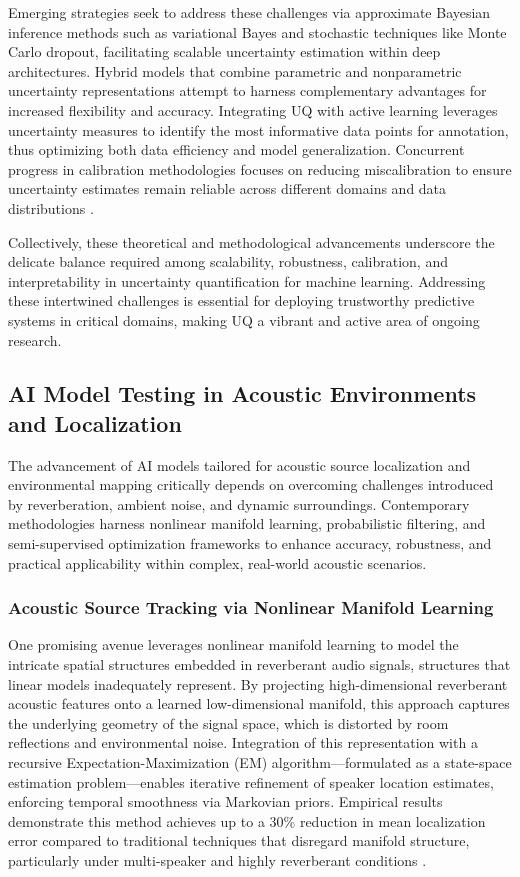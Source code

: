 \documentclass[sigconf]{acmart}
\begin{document}
Emerging strategies seek to address these challenges via approximate Bayesian inference methods such as variational Bayes and stochastic techniques like Monte Carlo dropout, facilitating scalable uncertainty estimation within deep architectures. Hybrid models that combine parametric and nonparametric uncertainty representations attempt to harness complementary advantages for increased flexibility and accuracy. Integrating UQ with active learning leverages uncertainty measures to identify the most informative data points for annotation, thus optimizing both data efficiency and model generalization. Concurrent progress in calibration methodologies focuses on reducing miscalibration to ensure uncertainty estimates remain reliable across different domains and data distributions \cite{ref28}.

Collectively, these theoretical and methodological advancements underscore the delicate balance required among scalability, robustness, calibration, and interpretability in uncertainty quantification for machine learning. Addressing these intertwined challenges is essential for deploying trustworthy predictive systems in critical domains, making UQ a vibrant and active area of ongoing research.

\subsection{AI Model Testing in Acoustic Environments and Localization}

The advancement of AI models tailored for acoustic source localization and environmental mapping critically depends on overcoming challenges introduced by reverberation, ambient noise, and dynamic surroundings. Contemporary methodologies harness nonlinear manifold learning, probabilistic filtering, and semi-supervised optimization frameworks to enhance accuracy, robustness, and practical applicability within complex, real-world acoustic scenarios.

\subsubsection{Acoustic Source Tracking via Nonlinear Manifold Learning}

One promising avenue leverages nonlinear manifold learning to model the intricate spatial structures embedded in reverberant audio signals, structures that linear models inadequately represent. By projecting high-dimensional reverberant acoustic features onto a learned low-dimensional manifold, this approach captures the underlying geometry of the signal space, which is distorted by room reflections and environmental noise. Integration of this representation with a recursive Expectation-Maximization (EM) algorithm—formulated as a state-space estimation problem—enables iterative refinement of speaker location estimates, enforcing temporal smoothness via Markovian priors. Empirical results demonstrate this method achieves up to a 30\% reduction in mean localization error compared to traditional techniques that disregard manifold structure, particularly under multi-speaker and highly reverberant conditions \cite{ref38}.
\end{document}
